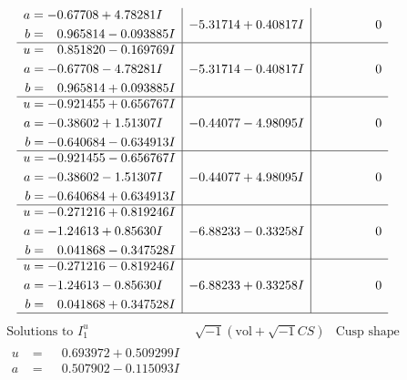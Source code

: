 \documentclass[1p]{elsarticle_modified}
\theoremstyle{definition}
\newcommand{\I}{\sqrt{-1}}
\begin{document}
$$\begin{array}{c|c|c}
\begin{aligned}
a &= -0.67708 + 4.78281 I \\
b &= \phantom{-}0.965814 - 0.093885 I\end{aligned}
 & -5.31714 + 0.40817 I & \phantom{-0.000000 } 0 \\ \hline\begin{aligned}
u &= \phantom{-}0.851820 - 0.169769 I \\
a &= -0.67708 - 4.78281 I \\
b &= \phantom{-}0.965814 + 0.093885 I\end{aligned}
 & -5.31714 - 0.40817 I & \phantom{-0.000000 } 0 \\ \hline\begin{aligned}
u &= -0.921455 + 0.656767 I \\
a &= -0.38602 + 1.51307 I \\
b &= -0.640684 - 0.634913 I\end{aligned}
 & -0.44077 - 4.98095 I & \phantom{-0.000000 } 0 \\ \hline\begin{aligned}
u &= -0.921455 - 0.656767 I \\
a &= -0.38602 - 1.51307 I \\
b &= -0.640684 + 0.634913 I\end{aligned}
 & -0.44077 + 4.98095 I & \phantom{-0.000000 } 0 \\ \hline\begin{aligned}
u &= -0.271216 + 0.819246 I \\
a &= -1.24613 + 0.85630 I \\
b &= \phantom{-}0.041868 - 0.347528 I\end{aligned}
 & -6.88233 - 0.33258 I & \phantom{-0.000000 } 0 \\ \hline\begin{aligned}
u &= -0.271216 - 0.819246 I \\
a &= -1.24613 - 0.85630 I \\
b &= \phantom{-}0.041868 + 0.347528 I\end{aligned}
 & -6.88233 + 0.33258 I & \phantom{-0.000000 } 0\\
 \hline 
 \end{array}$$\newpage$$\begin{array}{c|c|c}  
\text{Solutions to }I^u_{1}& \I (\text{vol} + \sqrt{-1}CS) & \text{Cusp shape}\\
 \hline 
\begin{aligned}
u &= \phantom{-}0.693972 + 0.509299 I \\
a &= \phantom{-}0.507902 - 0.115093 I \\

\end{aligned}
\end{array}$$
\end{document}
